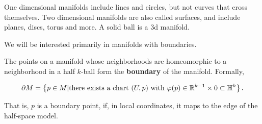\documentclass{article}
\begin{document}
\begin{example}
One dimensional \@{manifolds} include lines and circles, but not curves that cross themselves. Two dimensional manifolds are also called surfaces, and include planes, discs, torus and more. A solid ball is a 3d manifold.
\end{example}

\begin{remark}
We will be interested primarily in \@{manifolds} with \@{boundaries}.
\end{remark}

\begin{definition}[Boundary]
The points on a \@{manifold} whose \@{neighborhoods} are \@{homeomorphic} to a \@{neighborhood} in a half $k$-ball form the \textbf{boundary} of the \@{manifold}. Formally,

\[ \partial M = \left\{ p \in M | \text{there exists a chart } (U, p) \text{ with } \varphi(p) \in \mathbb{R}^{k-1} \times {0} \subset \mathbb{H}^k \right\}. \]

That is, $p$ is a boundary point, if, in local coordinates, it maps to the edge of the half-space model.
\end{definition}
\end{document}
